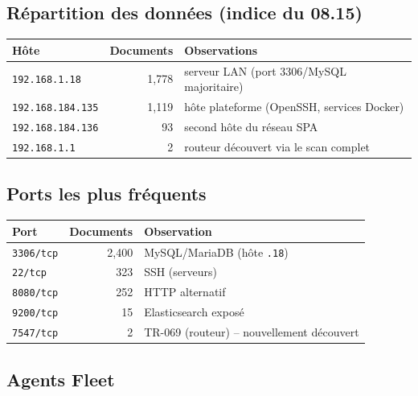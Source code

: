 \subsection{R\'epartition des donn\'ees (indice du 08.15)}

\begin{center}
\small
\begin{tabularx}{\linewidth}{@{}l r X@{}}
\toprule
\textbf{H\^ote} & \textbf{Documents} & \textbf{Observations} \\
\midrule
\texttt{192.168.1.18} & 1{,}778 & serveur LAN (port 3306/MySQL majoritaire) \\
\texttt{192.168.184.135} & 1{,}119 & h\^ote plateforme (OpenSSH, services Docker) \\
\texttt{192.168.184.136} & 93 & second h\^ote du r\'eseau SPA \\
\texttt{192.168.1.1} & 2 & routeur d\'ecouvert via le scan complet \\
\bottomrule
\end{tabularx}
\end{center}

\subsection{Ports les plus fr\'equents}

\begin{center}
\small
\begin{tabularx}{\linewidth}{@{}l r X@{}}
\toprule
\textbf{Port} & \textbf{Documents} & \textbf{Observation} \\
\midrule
\texttt{3306/tcp} & 2{,}400 & MySQL/MariaDB (h\^ote \texttt{.18}) \\
\texttt{22/tcp} & 323 & SSH (serveurs) \\
\texttt{8080/tcp} & 252 & HTTP alternatif \\
\texttt{9200/tcp} & 15 & Elasticsearch expos\'e \\
\texttt{7547/tcp} & 2 & TR-069 (routeur) -- nouvellement d\'ecouvert \\
\bottomrule
\end{tabularx}
\end{center}

\subsection{Agents Fleet}

